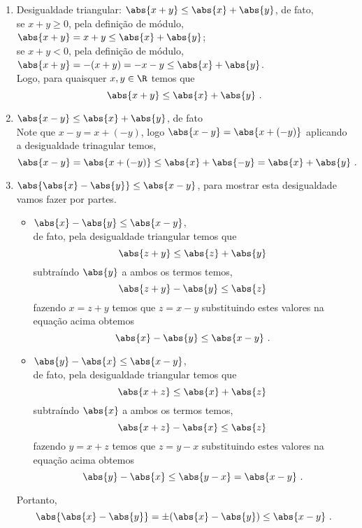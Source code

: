 \begin{prop}
\begin{enumerate}
 \item Desigualdade triangular: $\abs{x+y}\leq \abs{x}+\abs{y}$, de fato, \\
 se $x + y \geqslant 0$, pela definição de módulo, $\abs{x+y}= x+y \leq \abs{x} + \abs{y}$; \\
 se $x + y < 0$, pela definição de módulo, $\abs{x+y}= -(x+y)= -x-y \leq \abs{x} + \abs{y}$. \\
 Logo, para quaisquer $x, y \in \R$ temos que
\begin{equation}
\abs{x+y} \leq \abs{x}+\abs{y} \ .
\end{equation}

 \item $\abs{x-y} \leq \abs{x} + \abs{y}$, de fato \\
 Note que $x-y= x+ (-y)$, logo $\abs{x-y}= \abs{x+ (-y)}$ aplicando a desigualdade trinagular temos,
\begin{equation}
\abs{x-y}= \abs{x+ (-y)} \leq \abs{x} + \abs{-y}= \abs{x} + \abs{y} \ .
\end{equation}

 \item $\abs{\abs{x} - \abs{y}} \leq \abs{x - y}$, para mostrar esta desigualdade vamos fazer por partes.
 \begin{itemize}
 \item $\abs{x} - \abs{y} \leq \abs{x - y}$, \\
 de fato, pela desigualdade triangular temos que
\begin{equation}
\abs{z+y} \leq \abs{z} + \abs{y}
\end{equation}
 subtraíndo $\abs{y}$ a ambos os termos temos,
\begin{equation}
\abs{z+y} - \abs{y} \leq \abs{z}
\end{equation}
 fazendo $x= z+y$ temos que $z=x-y$ substituindo estes valores na equação acima obtemos
\begin{equation}
\abs{x} - \abs{y} \leq \abs{x-y} \ . 
\end{equation}
 \item $\abs{y} - \abs{x} \leq \abs{x - y}$, \\
 de fato, pela desigualdade triangular temos que
\begin{equation}
\abs{x+z} \leq \abs{x} + \abs{z}
\end{equation}
 subtraíndo $\abs{x}$ a ambos os termos temos,
\begin{equation}
\abs{x+z} - \abs{x} \leq \abs{z}
\end{equation}
 fazendo $y= x+z$ temos que $z=y-x$ substituindo estes valores na equação acima obtemos
\begin{equation}
\abs{y} - \abs{x} \leq \abs{y-x}= \abs{x-y} \ . 
\end{equation}
 \end{itemize}

 Portanto,
\begin{equation}
 \abs{\abs{x} - \abs{y}} = \pm (\abs{x} - \abs{y}) \leq \abs{x-y} \ .
\end{equation}

\end{enumerate}
\end{prop}
